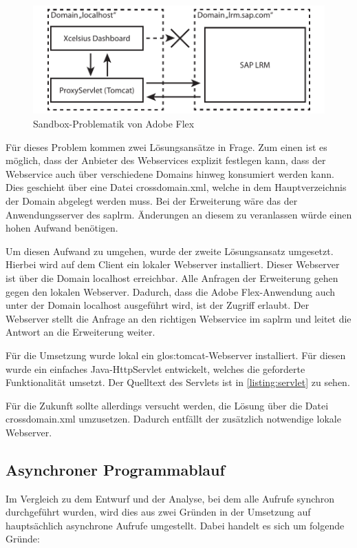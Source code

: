 \begin{onehalfspacing}
\begin{figure}[ht]
\centering
\setlength{\unitlength}{1mm}
\includegraphics[width=15cm]{images/Abbildung18-Flex-Sandbox.pdf}
\caption{Sandbox-Problematik von Adobe Flex\label{fig:flex_sandbox}}
\end{figure}

Für dieses Problem kommen zwei Lösungsansätze in Frage. Zum einen ist es möglich, dass der Anbieter des Webservices explizit festlegen kann, dass der Webservice auch über verschiedene Domains hinweg konsumiert werden kann. Dies geschieht über eine Datei crossdomain.xml, welche in dem Hauptverzeichnis der Domain abgelegt werden muss. Bei der Erweiterung wäre das der Anwendungsserver des \gls{saplrm}. Änderungen an diesem zu veranlassen würde einen hohen Aufwand benötigen. 

Um diesen Aufwand zu umgehen, wurde der zweite Lösungsansatz umgesetzt. Hierbei wird auf dem Client ein lokaler Webserver installiert. Dieser Webserver ist über die Domain localhost erreichbar. Alle Anfragen der Erweiterung gehen gegen den lokalen Webserver. Dadurch, dass die Adobe Flex-Anwendung auch unter der Domain localhost ausgeführt wird, ist der Zugriff erlaubt. Der Webserver stellt die Anfrage an den richtigen Webservice im \gls{saplrm} und leitet die Antwort an die Erweiterung weiter.

Für die Umsetzung wurde lokal ein \gls{glos:tomcat}-Webserver installiert. Für diesen wurde ein einfaches Java-HttpServlet entwickelt, welches die geforderte Funktionalität umsetzt. Der Quelltext des Servlets ist in \vref{listing:servlet} zu sehen.

Für die Zukunft sollte allerdings versucht werden, die Lösung über die Datei crossdomain.xml umzusetzen. Dadurch entfällt der zusätzlich notwendige lokale Webserver.

\subsection{Asynchroner Programmablauf}
\label{sec:asynchron}
Im Vergleich zu dem Entwurf und der Analyse, bei dem alle Aufrufe synchron durchgeführt wurden, wird dies aus zwei Gründen in der Umsetzung auf hauptsächlich asynchrone Aufrufe umgestellt. Dabei handelt es sich um folgende Gründe:


\end{onehalfspacing}
